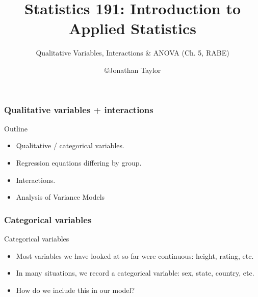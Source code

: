 \documentclass[handout]{beamer}
\title{Statistics 191: Introduction to Applied Statistics}
\subtitle{Qualitative Variables, Interactions \& ANOVA  (Ch. 5, RABE)}
\author{\copyright Jonathan Taylor \\
   }
\begin{document}
   \begin{frame}
   \titlepage
   \end{frame}


   \begin{frame} \frametitle{Qualitative variables + interactions}

   \begin{block}
   {Outline}
   \begin{itemize}

   \item Qualitative / categorical variables.

   \item Regression equations differing by group.

   \item Interactions.

   \item Analysis of Variance Models

   \end{itemize}
   \end{block}
   \end{frame}


   \begin{frame} \frametitle{Categorical variables}

   \begin{block}
   {Categorical variables}
   \begin{itemize}

   \item       Most variables we have looked at so far
   were continuous: height, rating, etc.

   \item In many situations, we record a categorical variable:
   sex, state, country, etc.

   \item How do we include this in our model?
   \end{itemize}
   \end{block}
   \end{frame}

\end{document}
